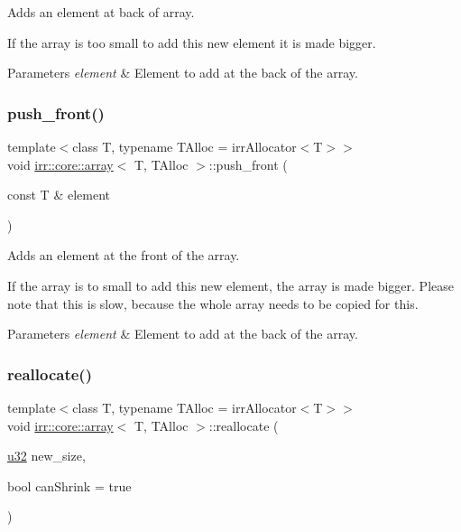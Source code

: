 Adds an element at back of array. 

If the array is too small to add this new element it is made bigger. 
\begin{DoxyParams}{Parameters}
{\em element} & Element to add at the back of the array. \\
\hline
\end{DoxyParams}
\mbox{\label{classirr_1_1core_1_1array_a31b686ce4b1ebae930f22bc40d30efbd}} 
\subsubsection{\texorpdfstring{push\+\_\+front()}{push\_front()}}
{\footnotesize\ttfamily template$<$class T, typename T\+Alloc = irr\+Allocator$<$\+T$>$$>$ \\
void \hyperlink{classirr_1_1core_1_1array}{irr\+::core\+::array}$<$ T, T\+Alloc $>$\+::push\+\_\+front (\begin{DoxyParamCaption}\item[{const T \&}]{element }\end{DoxyParamCaption})\hspace{0.3cm}{\ttfamily [inline]}}



Adds an element at the front of the array. 

If the array is to small to add this new element, the array is made bigger. Please note that this is slow, because the whole array needs to be copied for this. 
\begin{DoxyParams}{Parameters}
{\em element} & Element to add at the back of the array. \\
\hline
\end{DoxyParams}
\mbox{\label{classirr_1_1core_1_1array_ada5735f409eca82b9031d993ee8b31c3}} 
\subsubsection{\texorpdfstring{reallocate()}{reallocate()}}
{\footnotesize\ttfamily template$<$class T, typename T\+Alloc = irr\+Allocator$<$\+T$>$$>$ \\
void \hyperlink{classirr_1_1core_1_1array}{irr\+::core\+::array}$<$ T, T\+Alloc $>$\+::reallocate (\begin{DoxyParamCaption}\item[{\hyperlink{namespaceirr_a0416a53257075833e7002efd0a18e804}{u32}}]{new\+\_\+size,  }\item[{bool}]{can\+Shrink = {\ttfamily true} }\end{DoxyParamCaption})\hspace{0.3cm}{\ttfamily [inline]}}



